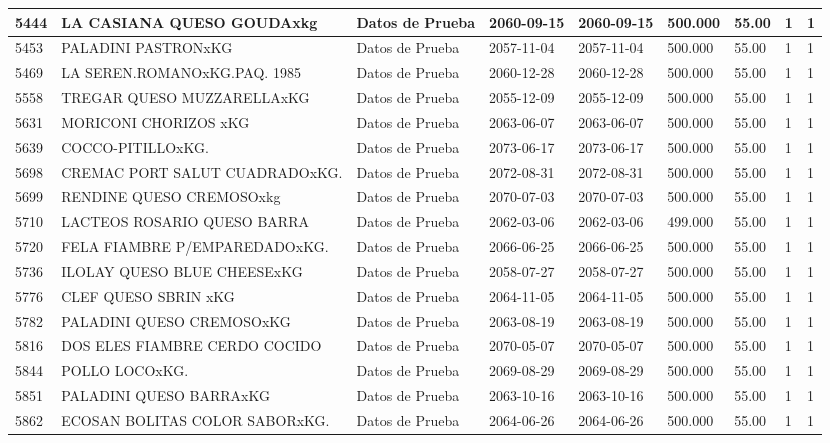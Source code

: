 \documentclass[a4paper,12pt]{article}
\begin{document}
\begin{landscape}
\begin{longtable}{|p{4cm}|p{2.5cm}|p{2.5cm}|p{1.8cm}|p{1.8cm}|p{1cm}|p{1cm}|p{3cm}|p{3cm}||}
5444 & LA CASIANA QUESO GOUDAxkg & Datos de Prueba & 2060-09-15 & 2060-09-15 & 500.000 & 55.00 & 1 & 1 \\ \hline 
5453 & PALADINI PASTRONxKG & Datos de Prueba & 2057-11-04 & 2057-11-04 & 500.000 & 55.00 & 1 & 1 \\ \hline 
5469 & LA SEREN.ROMANOxKG.PAQ.   1985 & Datos de Prueba & 2060-12-28 & 2060-12-28 & 500.000 & 55.00 & 1 & 1 \\ \hline 
5558 & TREGAR QUESO MUZZARELLAxKG & Datos de Prueba & 2055-12-09 & 2055-12-09 & 500.000 & 55.00 & 1 & 1 \\ \hline 
5631 & MORICONI CHORIZOS xKG & Datos de Prueba & 2063-06-07 & 2063-06-07 & 500.000 & 55.00 & 1 & 1 \\ \hline 
5639 & COCCO-PITILLOxKG. & Datos de Prueba & 2073-06-17 & 2073-06-17 & 500.000 & 55.00 & 1 & 1 \\ \hline 
5698 & CREMAC PORT SALUT CUADRADOxKG. & Datos de Prueba & 2072-08-31 & 2072-08-31 & 500.000 & 55.00 & 1 & 1 \\ \hline 
5699 & RENDINE QUESO CREMOSOxkg & Datos de Prueba & 2070-07-03 & 2070-07-03 & 500.000 & 55.00 & 1 & 1 \\ \hline 
5710 & LACTEOS ROSARIO QUESO BARRA & Datos de Prueba & 2062-03-06 & 2062-03-06 & 499.000 & 55.00 & 1 & 1 \\ \hline 
5720 & FELA FIAMBRE P/EMPAREDADOxKG. & Datos de Prueba & 2066-06-25 & 2066-06-25 & 500.000 & 55.00 & 1 & 1 \\ \hline 
5736 & ILOLAY QUESO BLUE CHEESExKG & Datos de Prueba & 2058-07-27 & 2058-07-27 & 500.000 & 55.00 & 1 & 1 \\ \hline 
5776 & CLEF QUESO SBRIN xKG & Datos de Prueba & 2064-11-05 & 2064-11-05 & 500.000 & 55.00 & 1 & 1 \\ \hline 
5782 & PALADINI QUESO CREMOSOxKG & Datos de Prueba & 2063-08-19 & 2063-08-19 & 500.000 & 55.00 & 1 & 1 \\ \hline 
5816 & DOS ELES FIAMBRE CERDO COCIDO & Datos de Prueba & 2070-05-07 & 2070-05-07 & 500.000 & 55.00 & 1 & 1 \\ \hline 
5844 & POLLO LOCOxKG. & Datos de Prueba & 2069-08-29 & 2069-08-29 & 500.000 & 55.00 & 1 & 1 \\ \hline 
5851 & PALADINI QUESO BARRAxKG & Datos de Prueba & 2063-10-16 & 2063-10-16 & 500.000 & 55.00 & 1 & 1 \\ \hline 
5862 & ECOSAN BOLITAS COLOR SABORxKG. & Datos de Prueba & 2064-06-26 & 2064-06-26 & 500.000 & 55.00 & 1 & 1 \\ \hline 

\end{longtable}
\end{landscape}
\end{document}
